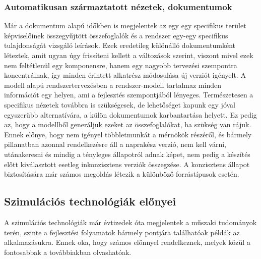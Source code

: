         \subsubsection{Automatikusan származtatott nézetek, dokumentumok}
        Már a dokumentum alapú időkben is megjelentek az egy egy specifikus terület képviselőinek összegyűjtött összefoglalók és a rendszer egy-egy specifikus tulajdonságát vizsgáló leírások.
        Ezek eredetileg különálló dokumentumként léteztek, amit ugyan úgy frissíteni kellett a változások szerint, viszont mivel ezek nem feltétlenül egy komponensre, hanem egy nagyobb tervezési szempontra koncentrálnak, így minden érintett alkatrész módosulása új verziót igényelt.
        A modell alapú rendszertervezésben a rendszer-modell tartalmaz minden információt egy helyen, ami a fejlesztés szempontjából lényeges.
        Természetesen a specifikus nézetek továbbra is szükségesek, de lehetőséget kapunk egy jóval egyszerűbb alternatívára, a külön dokumentumok karbantartása helyett.
        Ez pedig az, hogy a modellből generáljuk ezeket az összefoglalókat, ha szükség van rájuk. Ennek előnye, hogy nem igényel többletmunkát a mérnökök részéről, és bármely pillanatban azonnal rendelkezésre áll a naprakész verzió, nem kell várni, utánakeresni és mindig a tényleges állapotról adnak képet, nem pedig a készítés előtt kiválasztott esetleg inkonzisztens verziók összegzése. A konzisztens állapot biztosítására már számos megoldás létezik a különböző forrástípusok esetén. \cite{Git2024}\cite{LieberLieber2024}

    \subsection{Szimulációs technológiák előnyei}
    A szimulációs technológiák már évtizedek óta megjelentek a műszaki tudományok terén, szinte a fejlesztési folyamatok bármely pontjára találhatóak példák az alkalmazásukra.
    Ennek oka, hogy számos előnnyel rendelkeznek, melyek közül a fontosabbak a továbbiakban olvashatóak.

